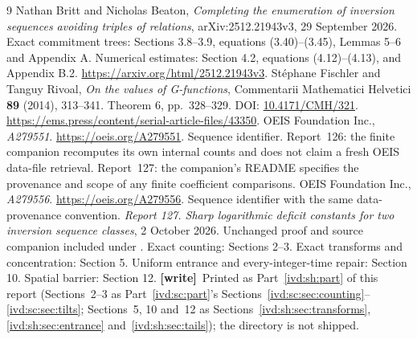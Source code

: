 \documentclass[11pt,letterpaper]{article}
\theoremstyle{remark}\newtheorem{remark}[theorem]{Remark}
\numberwithin{equation}{section}
\newcommand{\wtag}{\textup{\textbf{[write]}}}
\begin{document}
\begin{thebibliography}{9}
Nathan Britt and Nicholas Beaton,
\emph{Completing the enumeration of inversion sequences avoiding triples
of relations}, arXiv:2512.21943v3, 29 September 2026.
Exact commitment trees: Sections 3.8--3.9, equations (3.40)--(3.45),
Lemmas 5--6 and Appendix A. Numerical estimates: Section 4.2,
equations (4.12)--(4.13), and Appendix B.2.
\url{https://arxiv.org/html/2512.21943v3}.
St\'ephane Fischler and Tanguy Rivoal,
\emph{On the values of G-functions}, Commentarii Mathematici Helvetici
\textbf{89} (2014), 313--341. Theorem 6, pp.\ 328--329.
DOI: \href{https://doi.org/10.4171/CMH/321}{10.4171/CMH/321}.
\url{https://ems.press/content/serial-article-files/43350}.
OEIS Foundation Inc., \emph{A279551}.
\url{https://oeis.org/A279551}.
Sequence identifier. Report~126: the finite companion recomputes its own internal
counts and does not claim a fresh OEIS data-file retrieval. Report~127: the
companion's README specifies the provenance and scope of any finite coefficient
comparisons.
OEIS Foundation Inc., \emph{A279556}.
\url{https://oeis.org/A279556}.
Sequence identifier with the same data-provenance convention.
\emph{Report 127. Sharp logarithmic deficit constants for two inversion
sequence classes}, 2 October 2026. Unchanged proof and source companion
included under . Exact counting:
Sections 2--3. Exact transforms and concentration: Section 5.
Uniform entrance and every-integer-time repair: Section 10.
Spatial barrier: Section 12.
\wtag\ Printed as Part~\ref{ivd:sh:part} of this report (Sections~2--3 as
Part~\ref{ivd:sc:part}'s Sections~\ref{ivd:sc:sec:counting}--\ref{ivd:sc:sec:tilts};
Sections~5, 10 and~12 as Sections~\ref{ivd:sh:sec:transforms}, \ref{ivd:sh:sec:entrance}
and~\ref{ivd:sh:sec:tails}); the directory  is not shipped.
\end{thebibliography}
\end{document}
